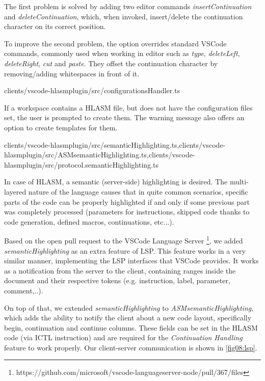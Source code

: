 The first problem is solved by adding two editor commands \emph{insertContinuation} and \emph{deleteContinuation}, which, when invoked, insert/delete the continuation character on its correct position.

To improve the second problem, the option overrides standard VSCode commands, commonly used when working in editor such as \emph{type}, \emph{deleteLeft}, \emph{deleteRight}, \emph{cut} and \emph{paste}. They offset the continuation character by removing/adding whitespaces in front of it.

{clients/vscode-hlasmplugin/src/configurationsHandler.ts}

If a workspace contains a HLASM file, but does not have the configuration files set, the user is prompted to create them. The warning message also offers an option to create templates for them.

{clients/vscode-hlasmplugin/src/semanticHighlighting.ts,clients/vscode-hlasmplugin/src/ASMsemanticHighlighting.ts,clients/vscode-hlasmplugin/src/protocol.semanticHighlighting.ts}

In case of HLASM, a semantic (server-side) highlighting is desired. The multi-layered nature of the language causes that in quite common scenarios, specific parts of the code can be properly highlighted if and only if some previous part was completely processed (parameters for instructions, skipped code thanks to code generation, defined macros, continuations, etc...).

Based on the open pull request to the VSCode Language Server \footnote{https://github.com/microsoft/vscode-languageserver-node/pull/367/files}, we added \emph{semanticHighlighting} as an extra feature of LSP. This feature works in a very similar manner, implementing the LSP interfaces that VSCode provides. It works as a notification from the server to the client, containing ranges inside the document and their respective tokens (e.g. instruction, label, parameter, comment,..). 

On top of that, we extended \emph{semanticHighlighting} to \emph{ASMsemanticHighlighting}, which adds the ability to notify the client about a new code layout, specifically begin, continuation and continue columns. These fields can be set in the HLASM code (via ICTL instruction) and are required for the \emph{Continuation Handling} feature to work properly. Our client-server communication is shown in \cref{fig08:lsp}.


